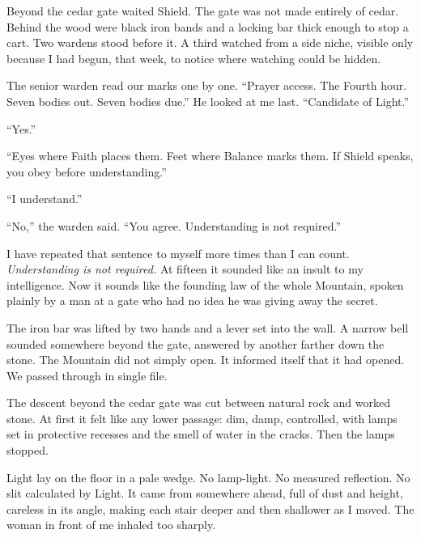 \ornament

\noindent Beyond the cedar gate waited Shield. The gate was not made entirely of cedar. Behind the wood were black iron bands and a locking bar thick enough to stop a cart. Two wardens stood before it. A third watched from a side niche, visible only because I had begun, that week, to notice where watching could be hidden.\par

The senior warden read our marks one by one. ``Prayer access. The Fourth hour. Seven bodies out. Seven bodies due.'' He looked at me last. ``Candidate of Light.''\par

``Yes.''\par

``Eyes where Faith places them. Feet where Balance marks them. If Shield speaks, you obey before understanding.''\par

``I understand.''\par

``No,'' the warden said. ``You agree. Understanding is not required.''\par

I have repeated that sentence to myself more times than I can count. \textit{Understanding is not required.} At fifteen it sounded like an insult to my intelligence. Now it sounds like the founding law of the whole Mountain, spoken plainly by a man at a gate who had no idea he was giving away the secret.\par

The iron bar was lifted by two hands and a lever set into the wall. A narrow bell sounded somewhere beyond the gate, answered by another farther down the stone. The Mountain did not simply open. It informed itself that it had opened. We passed through in single file.\par

The descent beyond the cedar gate was cut between natural rock and worked stone. At first it felt like any lower passage: dim, damp, controlled, with lamps set in protective recesses and the smell of water in the cracks. Then the lamps stopped.\par

Light lay on the floor in a pale wedge. No lamp-light. No measured reflection. No slit calculated by Light. It came from somewhere ahead, full of dust and height, careless in its angle, making each stair deeper and then shallower as I moved. The woman in front of me inhaled too sharply.\par

